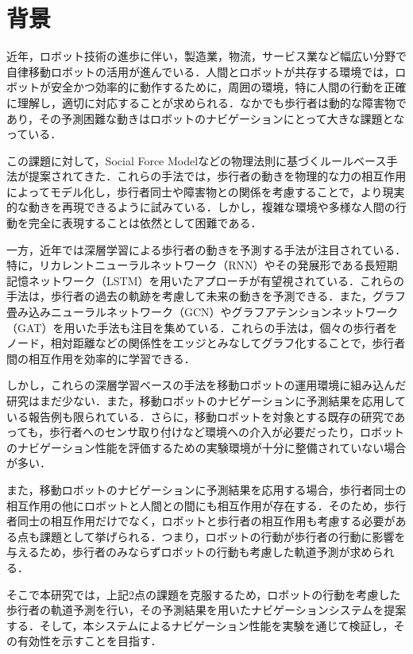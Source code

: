 
\section{背景}
近年，ロボット技術の進歩に伴い，製造業，物流，サービス業など幅広い分野で自律移動ロボットの活用が進んでいる．人間とロボットが共存する環境では，ロボットが安全かつ効率的に動作するために，周囲の環境，特に人間の行動を正確に理解し，適切に対応することが求められる．なかでも歩行者は動的な障害物であり，その予測困難な動きはロボットのナビゲーションにとって大きな課題となっている．

この課題に対して，Social Force Model\cite{s-lstm}などの物理法則に基づくルールベース手法が提案されてきた．これらの手法では，歩行者の動きを物理的な力の相互作用によってモデル化し，歩行者同士や障害物との関係を考慮することで，より現実的な動きを再現できるように試みている．しかし，複雑な環境や多様な人間の行動を完全に表現することは依然として困難である．

一方，近年では深層学習による歩行者の動きを予測する手法が注目されている．特に，リカレントニューラルネットワーク（RNN）\cite{rumelhart1986learning1,rumelhart1986learning2}やその発展形である長短期記憶ネットワーク（LSTM）\cite{hochreiter1997long}を用いたアプローチが有望視されている．これらの手法は，歩行者の過去の軌跡を考慮して未来の動きを予測できる．また，グラフ畳み込みニューラルネットワーク（GCN）\cite{kipf2016semi-gcn}やグラフアテンションネットワーク（GAT）\cite{velickovic2017graph-gat}を用いた手法も注目を集めている．これらの手法は，個々の歩行者をノード，相対距離などの関係性をエッジとみなしてグラフ化することで，歩行者間の相互作用を効率的に学習できる．

しかし，これらの深層学習ベースの手法を移動ロボットの運用環境に組み込んだ研究はまだ少ない．また，移動ロボットのナビゲーションに予測結果を応用している報告例も限られている．さらに，移動ロボットを対象とする既存の研究であっても，歩行者へのセンサ取り付けなど環境への介入が必要だったり，ロボットのナビゲーション性能を評価するための実験環境が十分に整備されていない場合が多い．

また，移動ロボットのナビゲーションに予測結果を応用する場合，歩行者同士の相互作用の他にロボットと人間との間にも相互作用が存在する．そのため，歩行者同士の相互作用だけでなく，ロボットと歩行者の相互作用も考慮する必要がある点も課題として挙げられる．つまり，ロボットの行動が歩行者の行動に影響を与えるため，歩行者のみならずロボットの行動も考慮した軌道予測が求められる．

そこで本研究では，上記2点の課題を克服するため，ロボットの行動を考慮した歩行者の軌道予測を行い，その予測結果を用いたナビゲーションシステムを提案する．そして，本システムによるナビゲーション性能を実験を通じて検証し，その有効性を示すことを目指す．

\newpage
